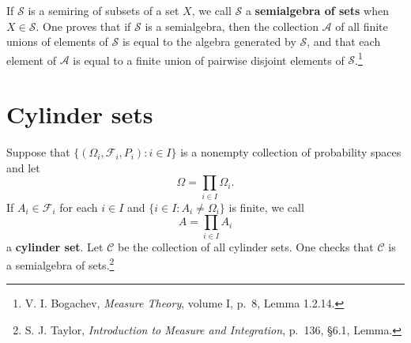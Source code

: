 \documentclass{article}
\theoremstyle{definition}
\begin{document}
If $\mathscr{S}$ is a semiring of subsets of a set $X$, we call $\mathscr{S}$ a \textbf{semialgebra of sets} when $X \in \mathscr{S}$. One proves
that if $\mathscr{S}$ is a semialgebra, then the collection $\mathscr{A}$ of all finite unions of elements of $\mathscr{S}$ is equal to the algebra
generated by $\mathscr{S}$, and that each element of $\mathscr{A}$ is equal to a finite union of pairwise disjoint elements of $\mathscr{S}$.\footnote{V. I. Bogachev, {\em Measure Theory}, volume I, p.~8, Lemma 1.2.14.} 

\section{Cylinder sets}
Suppose that $\{(\Omega_i,\mathscr{F}_i,P_i): i \in I\}$ is a nonempty collection of probability spaces and let
\[
\Omega = \prod_{i \in I} \Omega_i.
\]
If $A_i \in \mathscr{F}_i$ for each $i \in I$ and $\{i \in I: A_i \neq \Omega_i\}$ is finite,
we call
\[
A = \prod_{i \in I} A_i
\]
a \textbf{cylinder set}. Let $\mathscr{C}$ be the collection of all cylinder sets. 
One checks that $\mathscr{C}$ is a semialgebra of sets.\footnote{S. J. Taylor, {\em Introduction to Measure and Integration},
p.~136, \S 6.1, Lemma.}
\end{document}
